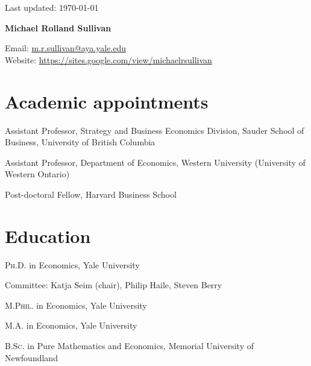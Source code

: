 \documentclass[11pt]{article} %
\begin{document}
 \begin{flushright}
   \scriptsize
	Last updated: \today
   \normalsize
\end{flushright}
{\LARGE\bfseries Michael Rolland Sullivan} %
\bigskip\bigskip\medskip %

\medskip %

Email: \href{mailto:m.r.sullivan@yale.edu}{m.r.sullivan@aya.yale.edu}\\ 
Website: \href{https://sites.google.com/view/michaelrsullivan/home}{https://sites.google.com/view/michaelrsullivan}\\ 

%

\section*{Academic appointments}

 Assistant Professor, Strategy and Business Economics Division, Sauder School of Business, 
	University of British Columbia

 Assistant Professor, Department of Economics, Western University (University of Western Ontario)

 Post-doctoral Fellow, Harvard Business School


\section*{Education}

\textsc{Ph.D.} in Economics, Yale University  

\hspace{1cm} \small Committee: Katja Seim (chair), Philip Haile, Steven Berry \normalsize

\textsc{M.Phil.} in Economics, Yale University 

\textsc{M.A.} in Economics, Yale University 

\textsc{B.Sc.} in Pure Mathematics and Economics, Memorial University of Newfoundland
\end{document}
